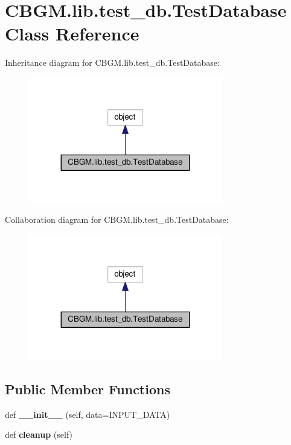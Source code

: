 \hypertarget{classCBGM_1_1lib_1_1test__db_1_1TestDatabase}{}\section{C\+B\+G\+M.\+lib.\+test\+\_\+db.\+Test\+Database Class Reference}
\label{classCBGM_1_1lib_1_1test__db_1_1TestDatabase}


Inheritance diagram for C\+B\+G\+M.\+lib.\+test\+\_\+db.\+Test\+Database\+:
\nopagebreak
\begin{figure}[H]
\begin{center}
\leavevmode
\includegraphics[width=239pt]{classCBGM_1_1lib_1_1test__db_1_1TestDatabase__inherit__graph}
\end{center}
\end{figure}


Collaboration diagram for C\+B\+G\+M.\+lib.\+test\+\_\+db.\+Test\+Database\+:
\nopagebreak
\begin{figure}[H]
\begin{center}
\leavevmode
\includegraphics[width=239pt]{classCBGM_1_1lib_1_1test__db_1_1TestDatabase__coll__graph}
\end{center}
\end{figure}
\subsection*{Public Member Functions}
\begin{DoxyCompactItemize}
\item 
\mbox{\label{classCBGM_1_1lib_1_1test__db_1_1TestDatabase_a5d9c034ab7f40291e3ec58a73fcbc8fe}} 
def {\bfseries \+\_\+\+\_\+init\+\_\+\+\_\+} (self, data=I\+N\+P\+U\+T\+\_\+\+D\+A\+TA)
\item 
\mbox{\label{classCBGM_1_1lib_1_1test__db_1_1TestDatabase_a28ea5e2bd5637fbc4fd5956045ffdb83}} 
def {\bfseries cleanup} (self)
\end{DoxyCompactItemize}
